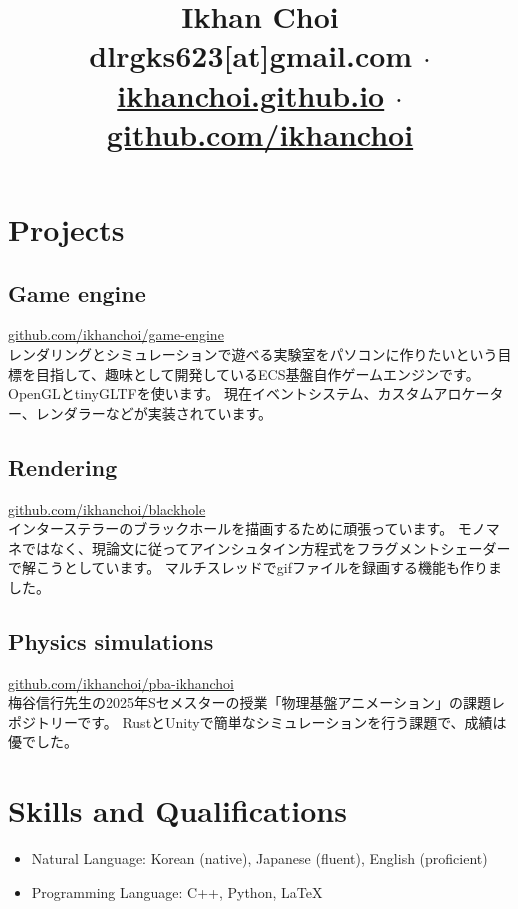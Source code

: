 \documentclass[11pt,a4paper]{article}
\title{\vspace{-40pt}
	Ikhan Choi\\[5pt]\small
	\faEnvelopeSquare\quad dlrgks623[at]gmail.com
	\quad$\cdot$\quad
	\faHome\quad\href{https://ikhanchoi.github.io}{ikhanchoi.github.io}
	\quad$\cdot$\quad
	\faGithub\quad\href{https://github.com/ikhanchoi}{github.com/ikhanchoi}
	\vspace{-5em}}
\date{}
\begin{document}
\maketitle



\section*{Projects}

\subsection*{Game engine}
\faGithub\quad\href{https://github.com/ikhanchoi/game-engine}{github.com/ikhanchoi/game-engine}\\[4pt]
\faArrowRight\quad
レンダリングとシミュレーションで遊べる実験室をパソコンに作りたいという目標を目指して、趣味として開発しているECS基盤自作ゲームエンジンです。
OpenGLとtinyGLTFを使います。
現在イベントシステム、カスタムアロケーター、レンダラーなどが実装されています。

\subsection*{Rendering}
\faGithub\quad\href{https://github.com/ikhanchoi/blackhole}{github.com/ikhanchoi/blackhole}\\[4pt]
\faArrowRight\quad
インターステラーのブラックホールを描画するために頑張っています。
モノマネではなく、現論文に従ってアインシュタイン方程式をフラグメントシェーダーで解こうとしています。
マルチスレッドでgifファイルを録画する機能も作りました。

\subsection*{Physics simulations}
\faGithub\quad\href{https://github.com/ikhanchoi/pba-ikhanchoi}{github.com/ikhanchoi/pba-ikhanchoi}\\[4pt]
\faArrowRight\quad
梅谷信行先生の2025年Sセメスターの授業「物理基盤アニメーション」の課題レポジトリーです。
RustとUnityで簡単なシミュレーションを行う課題で、成績は優でした。




\section*{Skills and Qualifications}
\begin{itemize}
\item Natural Language: Korean (native), Japanese (fluent), English (proficient)
\item Programming Language: C++, Python, LaTeX
\end{itemize}
	
\end{document}
